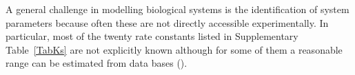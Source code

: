 \documentclass[oneside, 10pt, a4paper, twocolumn]{article}
\begin{document}
A general challenge in modelling biological systems is the identification of system parameters because often these are not directly accessible experimentally. In particular,
most of the twenty rate constants listed in Supplementary Table~\ref{TabKs}  are not explicitly known although for some of them a reasonable range can be estimated from data bases (\cite[BNID 103916, 106521, 105408]{Milo2010}). %
\end{document}
